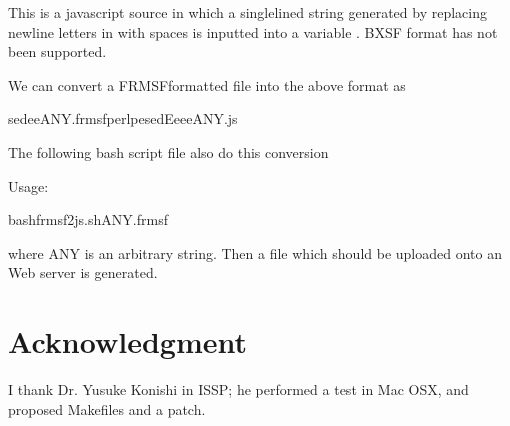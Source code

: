\documentclass[letterpaper,10pt,pdftex,openany,english]{sphinxmanual}
\begin{document}
\sphinxAtStartPar
This is a javascript source in which
a single\sphinxhyphen{}lined string generated by replacing new\sphinxhyphen{}line letters in {\hyperref[\detokenize{input:input}]{}} with spaces
is inputted into a variable .
BXSF format has not been supported.

\sphinxAtStartPar
We can convert a FRMSF\sphinxhyphen{}formatted file into the above format as

\begin{sphinxVerbatim}[commandchars=\\\{\}]
sed\PYGZhy{}e\PYGZhy{}eANY.frmsfperl\PYGZhy{}pesed\PYGZhy{}E\PYGZhy{}e\PYGZhy{}e\PYGZhy{}e\PYGZgt{}ANY.js
\end{sphinxVerbatim}

\sphinxAtStartPar
The following bash script file also do this conversion

\sphinxAtStartPar
{}

\sphinxAtStartPar
Usage:

\begin{sphinxVerbatim}[commandchars=\\\{\}]
\PYGZdl{}bashfrmsf2js.shANY.frmsf
\end{sphinxVerbatim}

\sphinxAtStartPar
where ANY is an arbitrary string.
Then a file  which should be uploaded onto an Web server is generated.

\sphinxstepscope


\chapter{Acknowledgment}
\label{\detokenize{ack:acknowledgment}}\label{\detokenize{ack::doc}}
\sphinxAtStartPar
I thank Dr. Yusuke Konishi in ISSP; he performed a test in Mac OSX, and
proposed Makefiles and a patch.
\end{document}
